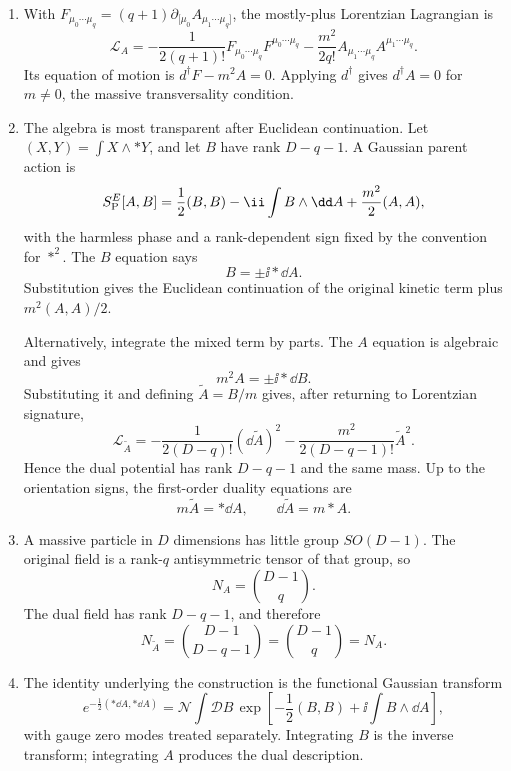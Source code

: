 \begin{enumerate}
  \begin{enumerate}
    \item With \(F_{\mu_0\cdots\mu_q}=(q+1)
      \partial_{[\mu_0}A_{\mu_1\cdots\mu_q]}\), the mostly-plus
      Lorentzian Lagrangian is
      \[
        \mathcal L_A
          =-\frac1{2(q+1)!}F_{\mu_0\cdots\mu_q}F^{\mu_0\cdots\mu_q}
           -\frac{m^2}{2q!}A_{\mu_1\cdots\mu_q}A^{\mu_1\cdots\mu_q}.
      \]
      Its equation of motion is \(d^\dagger F-m^2A=0\).  Applying
      \(d^\dagger\) gives \(d^\dagger A=0\) for \(m\ne0\), the massive
      transversality condition.

    \item The algebra is most transparent after Euclidean continuation.
      Let \((X,Y)=\int X\wedge *Y\), and let
      \(B\) have rank \(D-q-1\).  A Gaussian parent action is
      \[
        S_{\rm P}^{E}[A,B]
          =\frac12(B,B)-\ii\int B\wedge \dd A
            +\frac{m^2}{2}(A,A),
      \]
      with the harmless phase and a rank-dependent sign fixed by the
      convention for \(*^2\).  The \(B\) equation says
      \[
        B=\pm \ii*\dd A.
      \]
      Substitution gives the Euclidean continuation of the original
      kinetic term plus \(m^2(A,A)/2\).

      Alternatively, integrate the mixed term by parts.  The \(A\)
      equation is algebraic and gives
      \[
        m^2A=\pm \ii*\dd B.
      \]
      Substituting it and defining \(\widetilde A=B/m\) gives, after
      returning to Lorentzian signature,
      \[
        \mathcal L_{\widetilde A}
          =-\frac1{2(D-q)!}(\dd\widetilde A)^2
           -\frac{m^2}{2(D-q-1)!}\widetilde A^2 .
      \]
      Hence the dual potential has rank \(D-q-1\) and the same mass.  Up
      to the orientation signs, the first-order duality equations are
      \[
        m\widetilde A=*\dd A,
        \qquad \dd\widetilde A=m*A.
      \]

    \item A massive particle in \(D\) dimensions has little group
      \(SO(D-1)\).  The original field is a rank-\(q\) antisymmetric tensor
      of that group, so
      \[
        N_A=\binom{D-1}{q}.
      \]
      The dual field has rank \(D-q-1\), and therefore
      \[
        N_{\widetilde A}
          =\binom{D-1}{D-q-1}
          =\binom{D-1}{q}=N_A.
      \]

    \item The identity underlying the construction is the functional
      Gaussian transform
      \[
        e^{-\frac12(*\dd A,*\dd A)}
          =\mathcal{N}\int\mathcal{D}B\,
             \exp\!\left[-\frac12(B,B)+\ii\int B\wedge \dd A\right],
      \]
      with gauge zero modes treated separately.  Integrating \(B\) is the
      inverse transform; integrating \(A\) produces the dual description.


\end{enumerate}
\end{enumerate}
